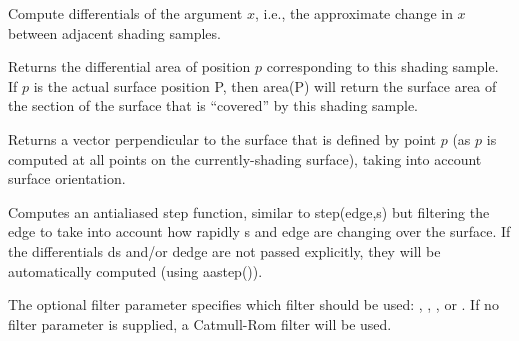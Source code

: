 \documentclass[11pt,letterpaper]{book}
\def\P{{\cf P}\xspace}
\begin{document}
Compute differentials of the argument $x$, i.e., the approximate change
in $x$ between adjacent shading samples.
\apiend


Returns the differential area of position $p$ corresponding to this
shading sample.  If $p$ is the actual surface position \P, then 
{\ce area(P)} will return the surface area of the section of the
surface that is ``covered'' by this shading sample.
\apiend

Returns a vector perpendicular to the surface that is defined by point
$p$ (as $p$ is computed at all points on the currently-shading surface),
taking into account surface orientation.
\apiend

Computes an antialiased step function, similar to {\cf step(edge,s)} but
filtering the edge to take into account how rapidly {\cf s} and {\cf edge}
are changing over the surface.  If the differentials {\cf ds} and/or
{\cf dedge} are not passed explicitly, they will be automatically 
computed (using {\cf aastep()}).

The optional {\cf filter} parameter specifies which filter should be
used: , , , or .
If no {\cf filter} parameter is supplied, a Catmull-Rom filter will be
used.

\apiend
\end{document}
